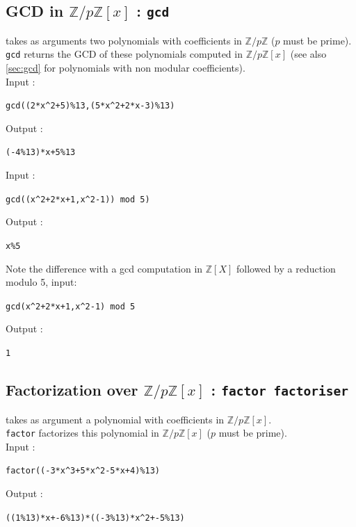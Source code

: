 \documentclass[a4paper,11pt]{book}
\newcommand{\Z}{{\mathbb{Z}}}
\begin{document}
\subsection{GCD in $\Z/p\Z[x]$ : {\tt gcd}}\label{sec:gcdm}
 takes as arguments two polynomials with 
coefficients in $\Z/p\Z$ ($p$ must be prime).\\
{\tt gcd} returns the GCD of these polynomials
computed in $\Z/p\Z[x]$ (see also 
\ref{sec:gcd} for polynomials with non modular coefficients).\\
Input :
\begin{center}{\tt gcd((2*x\verb|^|2+5)\%13,(5*x\verb|^|2+2*x-3)\%13)}\end{center}
Output :
\begin{center}{\tt (-4\%13)*x+5\%13}\end{center}
Input :
\begin{center}{\tt gcd((x\verb|^|2+2*x+1,x\verb|^|2-1)) mod 5)}\end{center} 
Output :
\begin{center}{\tt x\%5}\end{center}
Note the difference with a gcd computation in $\Z[X]$ followed
by a reduction modulo 5, input:
\begin{center}{\tt gcd(x\verb|^|2+2*x+1,x\verb|^|2-1) mod 5}\end{center} 
Output :
\begin{center}{\tt 1}\end{center}

\subsection{Factorization over $\Z/p\Z[x]$ : {\tt factor factoriser}}
 takes as argument a polynomial
with coefficients in $\Z/p\Z[x]$.\\
{\tt factor} factorizes this polynomial in $\Z/p\Z[x]$ ($p$ must
be prime).\\
Input :
\begin{center}{\tt factor((-3*x\verb|^|3+5*x\verb|^|2-5*x+4)\%13)}\end{center}
Output :
\begin{center}{\tt ((1\%13)*x+-6\%13)*((-3\%13)*x\verb|^|2+-5\%13)}\end{center}
\end{document}
